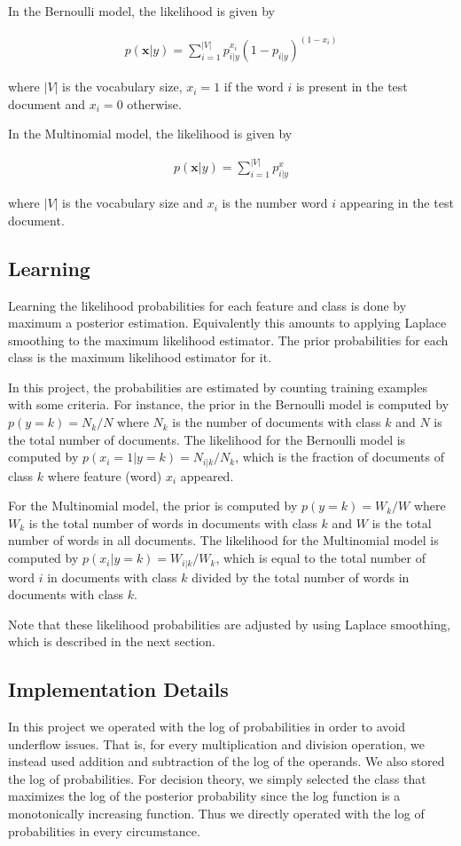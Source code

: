 \documentclass[12pt]{article}
\begin{document}
In the Bernoulli model, the likelihood is given by 

\begin{align}
p(\textbf{x}|y) = \sum_{i=1}^{|V|} p_{i|y}^{x_i} (1 - p_{i|y})^{(1-x_i)}
\end{align}

where \(|V|\) is the vocabulary size, \(x_i = 1\) if the word \(i\) is present in the test document and \(x_i = 0\) otherwise.

In the Multinomial model, the likelihood is given by 

\begin{align}
p(\textbf{x}|y) = \sum_{i=1}^{|V|} p_{i|y}^{x}
\end{align}

where \(|V|\) is the vocabulary size and \(x_i\) is the number word \(i\) appearing in the test document.

\subsection{Learning}
Learning the likelihood probabilities for each feature and class is done by maximum a posterior estimation. Equivalently this amounts to applying Laplace smoothing to the maximum likelihood estimator. The prior probabilities for each class is the maximum likelihood estimator for it.

In this project, the probabilities are estimated by counting training examples with some criteria. For instance, the prior in the Bernoulli model is computed by \(p(y = k) = N_k/N\) where \(N_k\) is the number of documents with class \(k\) and \(N\) is the total number of documents. The likelihood for the Bernoulli model is computed by \(p(x_i = 1 | y = k) = N_{i|k}/N_k\), which is the fraction of documents of class \(k\) where feature (word) \(x_i\) appeared.

For the Multinomial model, the prior is computed by \(p(y = k) = W_k/W\) where \(W_k\) is the total number of words in documents with class \(k\) and \(W\) is the total number of words in all documents. The likelihood for the Multinomial model is computed by \(p(x_i | y = k) = W_{i|k}/W_k\), which is equal to the total number of word \(i\) in documents with class \(k\) divided by the total number of words in documents with class \(k\).

Note that these likelihood probabilities are adjusted by using Laplace smoothing, which is described in the next section.

\subsection{Implementation Details}
In this project we operated with the log of probabilities in order to avoid underflow issues. That is, for every multiplication and division operation, we instead used addition and subtraction of the log of the operands. We also stored the log of probabilities. For decision theory, we simply selected the class that maximizes the log of the posterior probability since the log function is a monotonically increasing function. Thus we directly operated with the log of probabilities in every circumstance.
\end{document}
